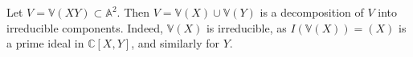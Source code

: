 \begin{example}
    Let \( V = \mathbb V(XY) \subset \mathbb A^2 \).
    Then \( V = \mathbb V(X) \cup \mathbb V(Y) \) is a decomposition of \( V \) into irreducible components.
    Indeed, \( \mathbb V(X) \) is irreducible, as \( I(\mathbb V(X)) = (X) \) is a prime ideal in \( \mathbb C[X, Y] \), and similarly for \( Y \).
\end{example}
